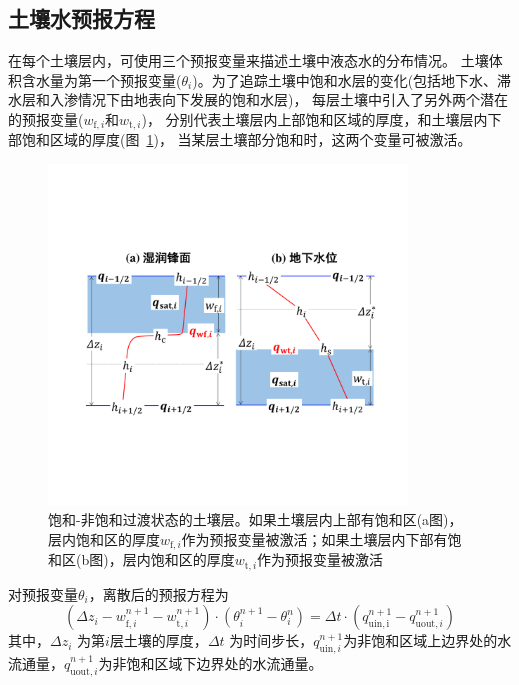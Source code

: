 \subsection{土壤水预报方程}
在每个土壤层内，可使用三个预报变量来描述土壤中液态水的分布情况。
土壤体积含水量为第一个预报变量($\theta_i$)。为了追踪土壤中饱和水层的变化(包括地下水、滞水层和入渗情况下由地表向下发展的饱和水层)，
每层土壤中引入了另外两个潜在的预报变量($w_{\mathrm{f},i}$和$w_{\mathrm{t},i}$)，
分别代表土壤层内上部饱和区域的厚度，和土壤层内下部饱和区域的厚度(图~\ref{fig:饱和-非饱和过渡状态的土壤层})，
当某层土壤部分饱和时，这两个变量可被激活。
{
  \begin{figure}[htbp]
    \centering
    \includegraphics[width=0.85\textwidth]{Figures/陆地表面的水分循环/饱和-非饱和过渡状态的土壤层.pdf}
    \caption[饱和-非饱和过渡状态的土壤层]{饱和-非饱和过渡状态的土壤层。如果土壤层内上部有饱和区(a图)，
    层内饱和区的厚度$w_{\mathrm{f},i}$作为预报变量被激活；如果土壤层内下部有饱和区(b图)，层内饱和区的厚度$w_{\mathrm{t},i}$作为预报变量被激活}
    \label{fig:饱和-非饱和过渡状态的土壤层}
  \end{figure}
}

对预报变量$\theta_i$，离散后的预报方程为
\begin{equation}\label{si_in1}
  \left(\Delta z_{i}-w_{\mathrm{f},i}^{n+1}-w_{\mathrm{t},i}^{n+1}\right) \cdot\left(\theta_{i}^{n+1}-\theta_{i}^{n}\right)=\Delta t \cdot\left(q_{\mathrm{ {uin,i }}}^{n+1}-q_{\mathrm{uout},i}^{n+1}\right)
\end{equation}
其中，$\Delta z_i$ 为第$ i $层土壤的厚度，$\Delta t$ 为时间步长，$q_{\mathrm{uin},i}^{n+1}$为非饱和区域上边界处的水流通量，$q_{\mathrm{uout},i}^{n+1}$为非饱和区域下边界处的水流通量。


